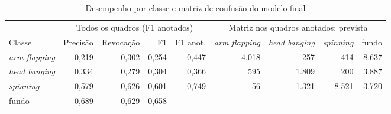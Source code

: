 \begin{table}[htbp]
\centering
\footnotesize
\caption{Desempenho por classe e matriz de confusão do modelo final}
\label{tab:final-classes}
\begin{tabular}{lrrrr|rrrr}
\toprule
 & \multicolumn{4}{c}{Todos os quadros (F1 anotados)} & \multicolumn{4}{c}{Matriz nos quadros anotados: prevista} \\
Classe & Precisão & Revocação & F1 & F1 anot. & \textit{arm flapping} & \textit{head banging} & \textit{spinning} & fundo \\
\midrule
\textit{arm flapping} & 0,219 & 0,302 & 0,254 & 0,447 & 4.018 & 257 & 414 & 8.637 \\
\textit{head banging} & 0,334 & 0,279 & 0,304 & 0,366 & 595 & 1.809 & 200 & 3.887 \\
\textit{spinning} & 0,579 & 0,626 & 0,601 & 0,749 & 56 & 1.321 & 8.521 & 3.720 \\
fundo & 0,689 & 0,629 & 0,658 & -- & -- & -- & -- & -- \\
\bottomrule
\end{tabular}
\end{table}
